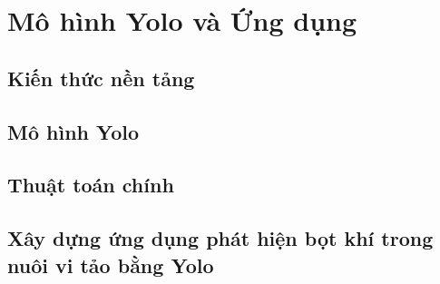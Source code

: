 \chapter{Mô hình Yolo và Ứng dụng}
\section{Kiến thức nền tảng}
\section{Mô hình Yolo}

\section{Thuật toán chính}

\section{Xây dựng ứng dụng phát hiện bọt khí trong nuôi vi tảo bằng Yolo}

